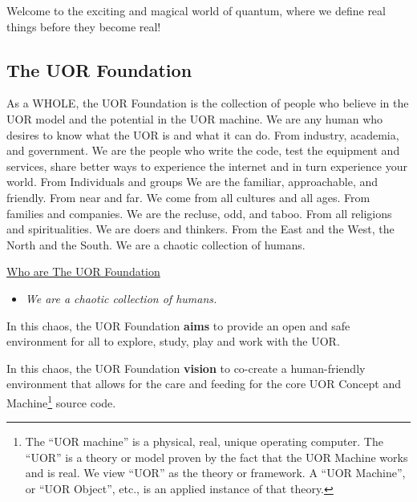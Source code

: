 \documentclass[twocolumn,10pt]{article}
\begin{document}
Welcome to the exciting and magical world of quantum, where we define real things before they become real!

\subsection*{The UOR Foundation}
As a WHOLE, the UOR Foundation is the collection of people who believe in the UOR model and the potential in the UOR machine.
We are any human who desires to know what the UOR is and what it can do.
From industry, academia, and government.
We are the people who write the code, test the equipment and services, share better ways to experience the internet and in turn experience your world.
From Individuals and groups
We are the familiar, approachable, and friendly.
From near and far.
We come from all cultures and all ages.
From families and companies.
We are the recluse, odd, and taboo.
From all religions and spiritualities.
We are doers and thinkers.
From the East and the West, the North and the South.
We are a chaotic collection of humans.

\vspace{20pt}
\begin{minipage}{0.95\linewidth}
    \begin{tcolorbox}
    \begin{center}\underline{Who are The UOR Foundation}\end{center}
        \begin{itemize}
            \item \textit{We are a chaotic collection of humans.}
        \end{itemize}
    \end{tcolorbox}
\end{minipage}
\vspace{10pt}


In this chaos, the UOR Foundation \textbf{aims} to provide an open and safe environment for all to explore, study, play and work with the UOR\@.

In this chaos, the UOR Foundation \textbf{vision} to co-create a human-friendly environment that allows for the care and feeding for the core UOR Concept and Machine\footnote{The ``UOR machine'' is a physical, real, unique operating computer. The ``UOR'' is a theory or model proven by the fact that the UOR Machine works and is real. We view ``UOR'' as the theory or framework. A ``UOR Machine'', or ``UOR Object'', etc., is an applied instance of that theory.} source code.
\end{document}
